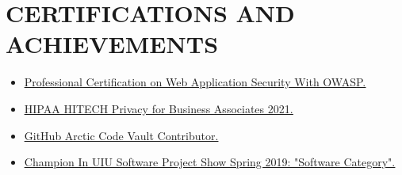 \documentclass[a4paper,11pt]{article}
\makeatletter
\newcommand{\resumeItem}[1]{
  \item\small{#1}
}
\newcommand{\resumeItemBulletListStart}{\begin{itemize}[rightmargin=0.11in, wide=0pt]}
\newcommand{\resumeItemBulletListEnd}{\end{itemize}}
\newcommand{\resumeTrioHeading}[3]{
  \item\small{
    \begin{tabular*}{0.96\textwidth}[t]{
      l@{\extracolsep{\fill}}c@{\extracolsep{\fill}}r
    }
      \textbf{#1} & \textit{#2} & #3
    \end{tabular*}
  }
}
\newcommand{\resumeHeadingListStart}{
  \begin{itemize}[leftmargin=0.15in, label={}]
}
\newcommand{\resumeHeadingListEnd}{\end{itemize}}
\makeatother
\begin{document}
\section{CERTIFICATIONS AND ACHIEVEMENTS}
  \resumeItemBulletListStart{}
    \resumeItem{\href{https://resume.aisayam.com/res/OWASP/Cert_OWASP_Top10_Advanced.pdf}{\uline{Professional Certification on Web Application Security With OWASP.}}}
    \resumeItem{\href{https://resume.aisayam.com/res/HIPAA/HipaaHitechPrivacyForBusinessAssociates.png}{\uline{HIPAA HITECH Privacy for Business Associates 2021.}}}
    \resumeItem{\href{https://github.com/sayam56?achievement=arctic-code-vault-contributor&tab=achievements}{\uline{GitHub Arctic Code Vault Contributor.}}}
    \resumeItem{\href{https://resume.aisayam.com//res/project_champ.pdf}{\uline{Champion In UIU Software Project Show Spring 2019: "Software Category".}}}   
  \resumeItemBulletListEnd{}





\end{document}
